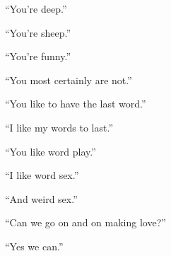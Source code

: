 \documentclass{article}
\begin{document}
``You're deep.''\newline
\newline

``You're sheep.''\newline
\newline

``You're funny.''\newline
\newline

``You most certainly are not.''\newline
\newline

``You like to have the last word.'' \newline
\newline

``I like my words to last.'' \newline
\newline

``You like word play.''\newline
\newline

``I like word sex.''\newline
\newline

``And weird sex.''\newline
\newline

``Can we go on and on making love?''\newline
\newline

``Yes we can.''\newline
\newline
\end{document}
